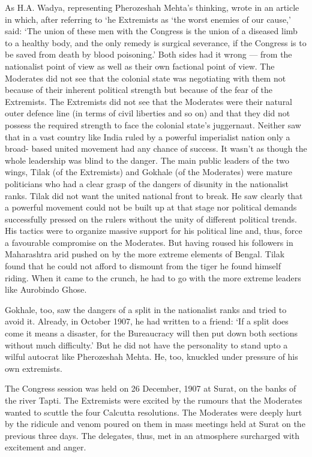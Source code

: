 As H.A. Wadya, representing Pherozeshah Mehta's thinking, wrote in an article in which, after referring to `he Extremists as `the worst enemies of our cause,' said: `The union of these men with the Congress is the union of a diseased limb to a healthy body, and the only remedy is surgical severance, if the Congress is to be saved from death by blood poisoning.' Both sides had it wrong --- from the nationalist point of view as well as their own factional point of view. The Moderates did not see that the colonial state was negotiating with them not because of their inherent political strength but because of the fear of the Extremists. The Extremists did not see that the Moderates were their natural outer defence line (in terms of civil liberties and so on) and that they did not possess the required strength to face the colonial state's juggernaut. Neither saw that in a vast country like India ruled by a powerful imperialist nation only a broad- based united movement had any chance of success. It wasn't as though the whole leadership was blind to the danger. The main public leaders of the two wings, Tilak (of the Extremists) and Gokhale (of the Moderates) were mature politicians who had a clear grasp of the dangers of disunity in the nationalist ranks. Tilak did not want the united national front to break. He saw clearly that a powerful movement could not be built up at that stage nor political demands successfully pressed on the rulers without the unity of different political trends. His tactics were to organize massive support for his political line and, thus, force a favourable compromise on the Moderates. But having roused his followers in Maharashtra arid pushed on by the more extreme elements of Bengal. Tilak found that he could not afford to dismount from the tiger he found himself riding. When it came to the crunch, he had to go with the more extreme leaders like Aurobindo Ghose.

Gokhale, too, saw the dangers of a split in the nationalist ranks and tried to avoid it. Already, in October 1907, he had written to a friend: `If a split does come it means a disaster, for the Bureaucracy will then put down both sections without much difficulty.' But he did not have the personality to stand upto a wilful autocrat like Pherozeshah Mehta. He, too, knuckled under pressure of his own extremists.

The Congress session was held on 26 December, 1907 at Surat, on the banks of the river Tapti. The Extremists were excited by the rumours that the Moderates wanted to scuttle the four Calcutta resolutions. The Moderates were deeply hurt by the ridicule and venom poured on them in mass meetings held at Surat on the previous three days. The delegates, thus, met in an atmosphere surcharged with excitement and anger.

